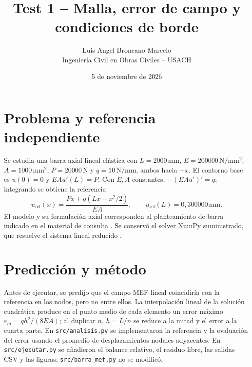 \documentclass[11pt]{article}
\title{Test 1 -- Malla, error de campo y condiciones de borde}
\author{Luis Angel Broncano Marcelo\\Ingeniería Civil en Obras Civiles -- USACH}
\date{5 de noviembre de 2026}
\begin{document}
\maketitle
\vspace{-1.0em}

\section{Problema y referencia independiente}
Se estudia una barra axial lineal elástica con $L=2000\,\mathrm{mm}$, $E=200000\,\mathrm{N/mm^2}$, $A=1000\,\mathrm{mm^2}$, $P=20000\,\mathrm{N}$ y $q=10\,\mathrm{N/mm}$, ambos hacia $+x$. El contorno base es $u(0)=0$ y $EAu'(L)=P$. Con $E,A$ constantes, $-(EAu')'=q$; integrando se obtiene la referencia
\[
 u_{\mathrm{ref}}(x)=\frac{Px+q(Lx-x^2/2)}{EA},\qquad
 u_{\mathrm{ref}}(L)=0{,}300000\,\mathrm{mm}.
\]
El modelo y su formulación axial corresponden al planteamiento de barra indicado en el material de consulta \cite{tudelftrod}. Se conservó el solver NumPy suministrado, que resuelve el sistema lineal reducido \cite{numpy}.

\section{Predicción y método}
Antes de ejecutar, se predijo que el campo MEF lineal coincidiría con la referencia en los nodos, pero no entre ellos. La interpolación lineal de la solución cuadrática produce en el punto medio de cada elemento un error máximo $\varepsilon_{m}=qh^2/(8EA)$; al duplicar $n$, $h=L/n$ se reduce a la mitad y el error a la cuarta parte. En \texttt{src/analisis.py} se implementaron la referencia y la evaluación del error usando el promedio de desplazamientos nodales adyacentes. En \texttt{src/ejecutar.py} se añadieron el balance relativo, el residuo libre, las salidas CSV y las figuras; \texttt{src/barra\_mef.py} no se modificó.
\end{document}
